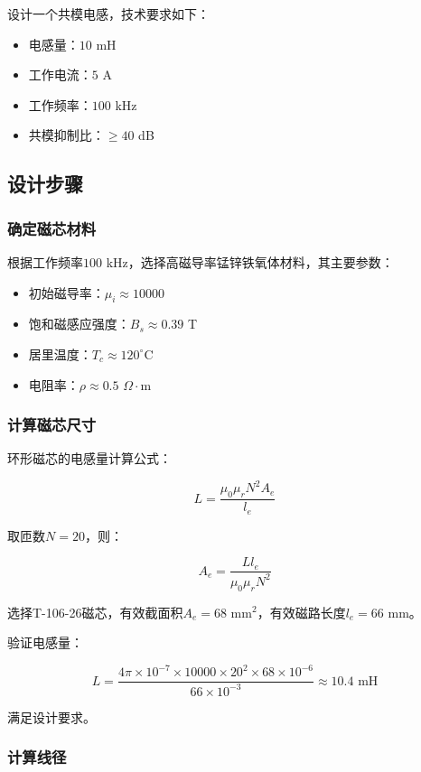 \documentclass[12pt,UTF8]{ctexbook}
\begin{document}
设计一个共模电感，技术要求如下：

\begin{itemize}[leftmargin=2cm]
    \item 电感量：$10$ mH
    \item 工作电流：$5$ A
    \item 工作频率：$100$ kHz
    \item 共模抑制比：$\ge 40$ dB
\end{itemize}

\subsection{设计步骤}

\subsubsection{确定磁芯材料}

根据工作频率$100$ kHz，选择高磁导率锰锌铁氧体材料，其主要参数：

\begin{itemize}[leftmargin=2cm]
    \item 初始磁导率：$\mu_i \approx 10000$
    \item 饱和磁感应强度：$B_s \approx 0.39$ T
    \item 居里温度：$T_c \approx 120^\circ$C
    \item 电阻率：$\rho \approx 0.5$ $\Omega\cdot$m
\end{itemize}

\subsubsection{计算磁芯尺寸}

环形磁芯的电感量计算公式：

$$ L = \frac{\mu_0 \mu_r N^2 A_e}{l_e} $$

取匝数$N = 20$，则：

$$ A_e = \frac{L l_e}{\mu_0 \mu_r N^2} $$

选择T-106-26磁芯，有效截面积$A_e = 68$ mm$^2$，有效磁路长度$l_e = 66$ mm。

验证电感量：

$$ L = \frac{4\pi \times 10^{-7} \times 10000 \times 20^2 \times 68 \times 10^{-6}}{66 \times 10^{-3}} \approx 10.4 \text{ mH} $$

满足设计要求。

\subsubsection{计算线径}
\end{document}
